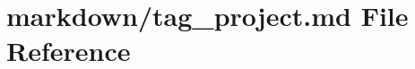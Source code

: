 \hypertarget{tag__project_8md}{}\section{markdown/tag\+\_\+project.md File Reference}
\label{tag__project_8md}
